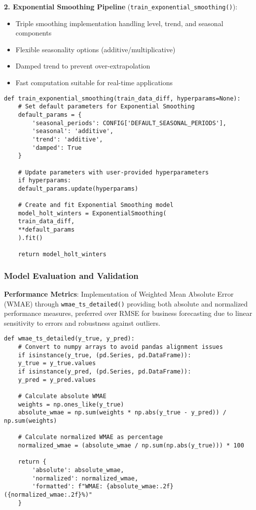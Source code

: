\textbf{2. Exponential Smoothing Pipeline} (\texttt{train\_exponential\_smoothing()}):
\begin{itemize}
	\item Triple smoothing implementation handling level, trend, and seasonal components
	\item Flexible seasonality options (additive/multiplicative)
	\item Damped trend to prevent over-extrapolation
	\item Fast computation suitable for real-time applications
\end{itemize}

\begin{lstlisting}[language=MyPython, caption={Exponential Smoothing Training Implementation}]
	def train_exponential_smoothing(train_data_diff, hyperparams=None):
	# Set default parameters for Exponential Smoothing
	default_params = {
		'seasonal_periods': CONFIG['DEFAULT_SEASONAL_PERIODS'],
		'seasonal': 'additive',
		'trend': 'additive',
		'damped': True
	}
	
	# Update parameters with user-provided hyperparameters
	if hyperparams:
	default_params.update(hyperparams)
	
	# Create and fit Exponential Smoothing model
	model_holt_winters = ExponentialSmoothing(
	train_data_diff,
	**default_params
	).fit()
	
	return model_holt_winters
\end{lstlisting}

\subsubsection{Model Evaluation and Validation}

\textbf{Performance Metrics}: Implementation of Weighted Mean Absolute Error (WMAE) through \texttt{wmae\_ts\_detailed()} providing both absolute and normalized performance measures, preferred over RMSE for business forecasting due to linear sensitivity to errors and robustness against outliers.

\begin{lstlisting}[language=MyPython, caption={WMAE Evaluation Metric Implementation}]
	def wmae_ts_detailed(y_true, y_pred):
	# Convert to numpy arrays to avoid pandas alignment issues
	if isinstance(y_true, (pd.Series, pd.DataFrame)):
	y_true = y_true.values
	if isinstance(y_pred, (pd.Series, pd.DataFrame)):
	y_pred = y_pred.values
	
	# Calculate absolute WMAE
	weights = np.ones_like(y_true)
	absolute_wmae = np.sum(weights * np.abs(y_true - y_pred)) / np.sum(weights)
	
	# Calculate normalized WMAE as percentage
	normalized_wmae = (absolute_wmae / np.sum(np.abs(y_true))) * 100
	
	return {
		'absolute': absolute_wmae,
		'normalized': normalized_wmae,
		'formatted': f"WMAE: {absolute_wmae:.2f} ({normalized_wmae:.2f}%)"
	}
\end{lstlisting}

